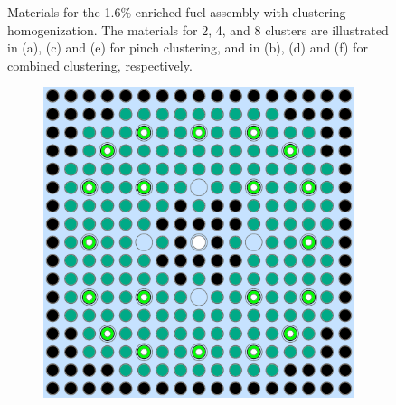 \begin{figure}[h!]
\begin{subfigure}{0.48\textwidth}
  \caption{}
  \label{fig:chap10-assm-16-combined-8}
\end{subfigure}
\caption[Materials for the 1.6\% fuel assembly with clustering homogenization]{Materials for the 1.6\% enriched fuel assembly with clustering homogenization. The materials for 2, 4, and 8 clusters are illustrated in (a), (c) and (e) for pinch clustering, and in (b), (d) and (f) for combined clustering, respectively.}
\label{fig:chap10-assm-16-geometries}
\end{figure}

\clearpage

\begin{figure}[h!]
\centering
\begin{subfigure}{0.48\textwidth}
  \centering
  \includegraphics[width=0.9\linewidth]{figures/unsupervised/geometries/with-features/2-clusters/pinch/assm-31-20BPs}
  \caption{}
  \label{fig:chap10-assm-31-20BPs-pinch-2}
\end{subfigure}%
\begin{subfigure}{0.48\textwidth}
  \centering

\end{subfigure}
\end{figure}

